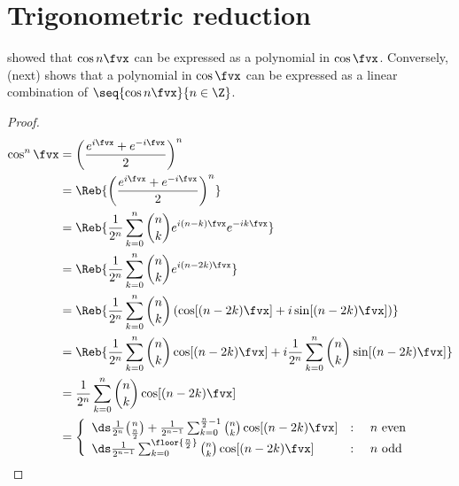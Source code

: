 \section{Trigonometric reduction}
 showed that $\cos n\fvx$ can be expressed as 
a polynomial in $\cos\fvx$.
Conversely,  (next) shows that 
a polynomial in $\cos\fvx$
can be expressed as a linear combination of $\seq{\cos n\fvx}{n\in\Z}$.
\begin{theorem}
\label{thm:cos^nx}
\end{theorem}
\begin{proof}
\begin{align*}
  \cos^n\fvx
    &=  \left( \frac{e^{i\fvx}+e^{-i\fvx}}{2} \right)^n
  \\&=  \Reb{\left( \frac{e^{i\fvx}+e^{-i\fvx}}{2} \right)^n}
  \\&=  \Reb{\frac{1}{2^n} \sum_{k=0}^n \binom{n}{k} e^{i(n-k)\fvx}e^{-ik\fvx} }
  \\&=  \Reb{\frac{1}{2^n} \sum_{k=0}^n \binom{n}{k} e^{i(n-2k)\fvx}}
  \\&=  \Reb{\frac{1}{2^n} \sum_{k=0}^n \binom{n}{k} \left(\cos[(n-2k)\fvx]+i\sin[(n-2k)\fvx] \right) }
  \\&=  \Reb{\frac{1}{2^n} \sum_{k=0}^n \binom{n}{k} \cos[(n-2k)\fvx]+
             i\frac{1}{2^n} \sum_{k=0}^n \binom{n}{k} \sin[(n-2k)\fvx]  }
  \\&=  \frac{1}{2^n} \sum_{k=0}^n \binom{n}{k}\cos[(n-2k)\fvx] 
  \\&=  \left\{\begin{array}{lcl}\ds
      \frac{1}{2^n}\binom{n}{\frac{n}{2}} +
      \frac{1}{2^{n-1}} \sum_{k=0}^{\frac{n}{2}-1} \binom{n}{k}\cos[(n-2k)\fvx]
      &:&\mbox{ $n$ even}
      \\ \ds
      \frac{1}{2^{n-1}} \sum_{k=0}^{\floor{\frac{n}{2}}} \binom{n}{k}\cos[(n-2k)\fvx] 
      &:&\mbox{ $n$ odd}
    \end{array}\right.
\end{align*}
\end{proof}

